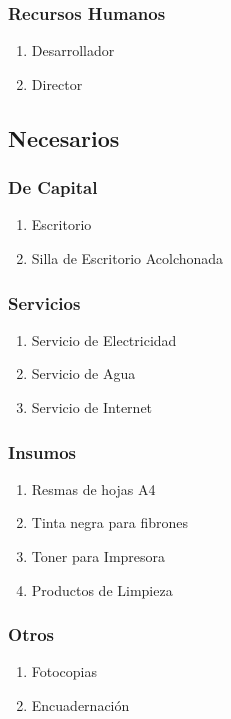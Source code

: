 \documentclass[a4paper, 10pt, oneside]{book}
\begin{document}
    \subsubsection{Recursos Humanos}
    \begin{enumerate}
        \item Desarrollador
        \item Director
    \end{enumerate}

    \subsection{Necesarios}\label{subsec:recursosNecesarios}

    \subsubsection{De Capital}
    \begin{enumerate}
        \item Escritorio
        \item Silla de Escritorio Acolchonada
    \end{enumerate}

    \subsubsection{Servicios}
    \begin{enumerate}
        \item Servicio de Electricidad
        \item Servicio de Agua
        \item Servicio de Internet
    \end{enumerate}

    \subsubsection{Insumos}

    \begin{enumerate}
        \item Resmas de hojas A4
        \item Tinta negra para fibrones
        \item Toner para Impresora
        \item Productos de Limpieza
    \end{enumerate}

    \subsubsection{Otros}
    \begin{enumerate}
        \item Fotocopias
        \item Encuadernación
    \end{enumerate}
\end{document}

